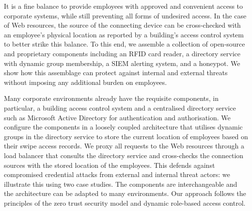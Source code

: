 It is a fine balance to provide employees with approved and convenient
access to corporate systems, while still preventing all forms of
undesired access.  In the case of Web resources, the source of the
connecting device can be cross-checked with an employee's physical
location as reported by a building's access control system to better
strike this balance.  To this end, we assemble a collection of
open-source and proprietary components including an RFID card reader,
a directory service with dynamic group membership, a SIEM alerting
system, and a honeypot.  We show how this assemblage can protect
against internal and external threats without imposing any additional
burden on employees.

Many corporate environments already have the requisite components, in
particular, a building access control system and a centralised
directory service such as Microsoft Active Directory for
authentication and authorisation.  We configure the components in a
loosely coupled architecture that utilises dynamic groups in the
directory service to store the current location of employees based on
their swipe access records.  We proxy all requests to the Web
resources through a load balancer that consults the directory service
and cross-checks the connection sources with the stored location of
the employees.  This defends against compromised credential attacks
from external and internal threat actors: we illustrate this using two
case studies.  The components are interchangeable and the architecture
can be adapted to many environments.  Our approach follows the
principles of the zero trust security model and dynamic role-based
access control.

